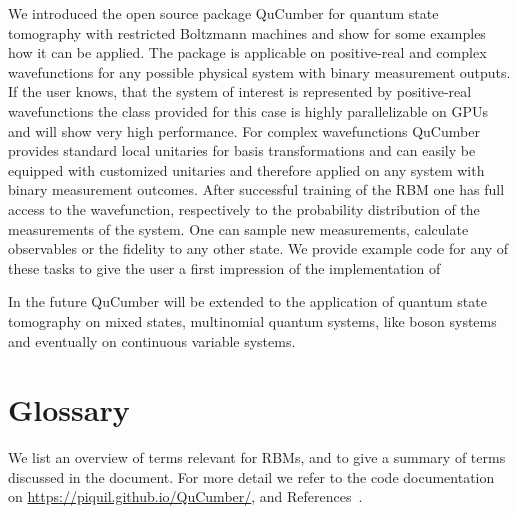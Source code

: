 \documentclass[submission, Phys]{SciPost}
\begin{document}
We introduced the open source package QuCumber for quantum state tomography with restricted Boltzmann machines and show for some examples how it can be applied. The package is applicable on positive-real and complex wavefunctions for any
possible physical system with binary measurement outputs. If the user knows, that the system of interest is represented by positive-real wavefunctions the class provided for this case is highly parallelizable on GPUs and will show very high performance. For complex wavefunctions QuCumber provides standard local unitaries for basis transformations and can easily be equipped with customized unitaries and therefore applied on any system with binary measurement outcomes.
After successful training of the RBM one has full access to the wavefunction, respectively to the probability distribution of the measurements of the system. One can sample new measurements, calculate observables or the fidelity to any other state. We provide example code for any of these tasks to give the user a first impression of the implementation of 

In the future QuCumber will be extended to the application of quantum state tomography on mixed states, multinomial quantum systems, like boson systems and eventually on continuous variable systems.

\section{Glossary}
\label{Glossary}

We list an overview of terms relevant for RBMs, and to give a summary of terms discussed in the document.  For more detail we refer to the code documentation on \url{https://piquil.github.io/QuCumber/}, and References~\cite{hinton2002training, hinton2012practical}.
\end{document}
